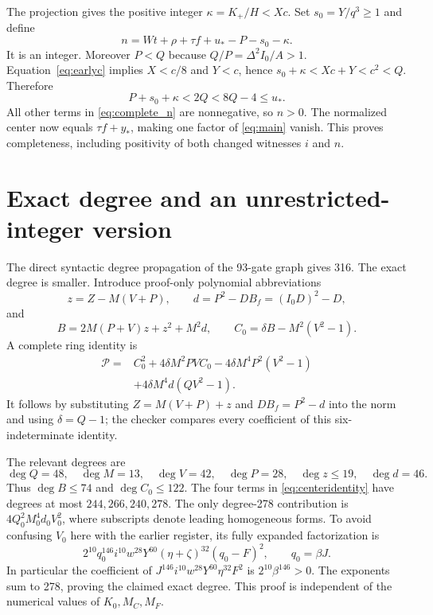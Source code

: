 \documentclass[11pt]{article}
\theoremstyle{remark}\newtheorem{remark}[theorem]{Remark}
\begin{document}
The projection gives the positive integer $\kappa=K_+/H<Xc$.
Set $s_0=Y/q^3\ge1$ and define
\begin{equation}\label{eq:complete_n}
n=Wt+\rho+\tau f+u_*-P-s_0-\kappa.
\end{equation}
It is an integer. Moreover $P<Q$ because
$Q/P=\Delta^2I_0/A>1$. Equation~\eqref{eq:earlyc} implies
$X<c/8$ and $Y<c$, hence
$s_0+\kappa<Xc+Y<c^2<Q$. Therefore
\[
P+s_0+\kappa<2Q<8Q-4\le u_*.
\]
All other terms in \eqref{eq:complete_n} are nonnegative, so $n>0$.
The normalized center now equals $\tau f+y_*$, making one factor of
\eqref{eq:main} vanish. This proves completeness, including positivity of
both changed witnesses $i$ and $n$.

\section{Exact degree and an unrestricted-integer version}

The direct syntactic degree propagation of the 93-gate graph gives 316.
The exact degree is smaller. Introduce proof-only polynomial abbreviations
\[
z=Z-M(V+P),\qquad d=P^2-DB_f=(I_0D)^2-D,
\]
and
\[
B=2M(P+V)z+z^2+M^2d,\qquad
C_0=\delta B-M^2(V^2-1).
\]
A complete ring identity is
\begin{align}\label{eq:centeridentity}
\mathcal P={}&C_0^2+4\delta M^2PV C_0
-4\delta M^4P^2(V^2-1)\nonumber\\
&+4\delta M^4d(QV^2-1).
\end{align}
It follows by substituting $Z=M(V+P)+z$ and $DB_f=P^2-d$ into the
norm and using $\delta=Q-1$; the checker compares every coefficient of
this six-indeterminate identity.

The relevant degrees are
\[
\deg Q=48,\quad\deg M=13,\quad\deg V=42,\quad\deg P=28,
\quad\deg z\le19,\quad\deg d=46.
\]
Thus $\deg B\le74$ and $\deg C_0\le122$. The four terms in
\eqref{eq:centeridentity} have degrees at most $244,266,240,278$.
The only degree-278 contribution is $4Q_0^2M_0^4d_0V_0^2$, where subscripts
denote leading homogeneous forms. To avoid confusing $V_0$ here with the
earlier register, its fully expanded factorization is
\begin{equation}\label{eq:leading}
2^{10}q_0^{146}i^{10}w^{28}Y^{60}(\eta+\zeta)^{32}(q_0-F)^2,
\qquad q_0=\beta J.
\end{equation}
In particular the coefficient of
$J^{146}i^{10}w^{28}Y^{60}\eta^{32}F^2$ is
$2^{10}\beta^{146}>0$. The exponents sum to 278, proving the claimed
exact degree. This proof is independent of the numerical values of
$K_0,M_C,M_F$.
\end{document}
